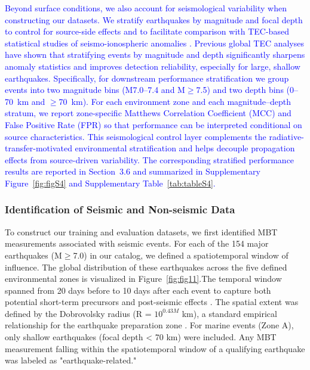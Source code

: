 \documentclass[preprint,review,12pt,authoryear]{elsarticle}
\providecommand{\DIFaddtex}[1]{{\sf #1}} %
\providecommand{\DIFaddbegin}{} %
\providecommand{\DIFaddend}{} %
\providecommand{\DIFadd}[1]{\texorpdfstring{\DIFaddtex{#1}}{#1}} %
\newcommand{\DIFaddincludegraphics}[2][]{{\color{blue}\fbox{\DIFOincludegraphics[#1]{#2}}}} %
\DeclareRobustCommand{\DIFaddbegin}{\DIFOaddbegin \let\includegraphics\DIFaddincludegraphics} %
\DeclareRobustCommand{\DIFaddend}{\DIFOaddend \let\includegraphics\DIFOincludegraphics} %
\renewcommand{\DIFaddtex}[1]{\textcolor{blue}{#1}}
\begin{document}
\DIFaddbegin \DIFadd{Beyond surface conditions, we also account for seismological variability when constructing our datasets. We stratify earthquakes by magnitude and focal depth to control for source-side effects and to facilitate comparison with TEC-based statistical studies of seismo-ionospheric anomalies \citep{shahJin2015,shahTotalElectronContent2020,shahASR2022}. Previous global TEC analyses have shown that stratifying events by magnitude and depth significantly sharpens anomaly statistics and improves detection reliability, especially for large, shallow earthquakes. Specifically, for downstream performance stratification we group events into two magnitude bins (M7.0--7.4 and M$\ge$7.5) and two depth bins (0--70~km and $\ge$70~km). For each environment zone and each magnitude--depth stratum, we report zone-specific Matthews Correlation Coefficient (MCC) and False Positive Rate (FPR) so that performance can be interpreted conditional on source characteristics. This seismological control layer complements the radiative-transfer-motivated environmental stratification and helps decouple propagation effects from source-driven variability. The corresponding stratified performance results are reported in Section~3.6 and summarized in Supplementary Figure~\ref{fig:figS4} and Supplementary Table~\ref{tab:tableS4}.
}

\DIFaddend \subsubsection{Identification of Seismic and Non-seismic Data}\label{sec:data_identification}
To construct our training and evaluation datasets, we first identified MBT measurements associated with seismic events. For each of the 154 major earthquakes (M$\ge$7.0) in our catalog, we defined a spatiotemporal window of influence. The global distribution of these earthquakes across the five defined environmental zones is visualized in Figure~\ref{fig:fig11}.The temporal window spanned from 20 days before to 10 days after each event to capture both potential short-term precursors and post-seismic effects \citep{akhoondzadehMultiPrecursorsAnalysis2018,qiSpatiotemporallyWeightedTwostep2020}. The spatial extent was defined by the Dobrovolsky radius (R = $10^{0.43M}$ km), a standard empirical relationship for the earthquake preparation zone \citep{dobrovolskyEstimationSizeEarthquake1979}. For marine events (Zone A), only shallow earthquakes (focal depth < 70 km) were included. Any MBT measurement falling within the spatiotemporal window of a qualifying earthquake was labeled as "earthquake-related."
\end{document}
